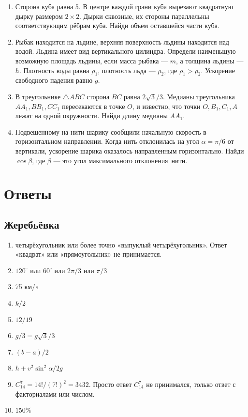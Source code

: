 \documentclass[12pt]{article} %
\begin{document}
\begin{enumerate}
\item Сторона куба равна 5. В центре каждой грани куба вырезают квадратную дырку размером $2 \times 2$. 
Дырки сквозные, их стороны параллельны соответствующим рёбрам куба. Найди объем оставшейся части куба.

\item Рыбак находится на льдине, верхняя поверхность льдины находится над водой. 
Льдина имеет вид вертикального цилиндра. Определи наименьшую возможную площадь льдины, если масса рыбака — $m$, 
а толщина льдины — $h$. Плотность воды равна $\rho_1$, плотность льда — $\rho_2$, где $\rho_1 > \rho_2$. 
Ускорение свободного падения равно $g$.

\item В треугольнике $\bigtriangleup ABC$ сторона $BC$ равна $2 \sqrt{3} / 3$. 
Медианы треугольника $A A_1$,\,$B B_1$,\,$C C_1$ пересекаются в точке $O$, и известно, 
что точки $O$,\,$B_1$,\,$C_1$,\,$A$ лежат на одной окружности. Найди длину медианы $A A_1$.

\item Подвешенному на нити шарику сообщили начальную скорость в горизонтальном направлении. 
Когда нить отклонилась на угол $\alpha = \pi/6$ от вертикали, ускорение шарика оказалось направленным горизонтально. 
Найди $\cos\beta$, где $\beta$ — это угол максимального отклонения~нити.

\end{enumerate}
    

\section*{Ответы}

\subsection*{Жеребьёвка}

\begin{enumerate}
\item четырёхугольник или более точно «выпуклый четырёхугольник». Ответ «квадрат» или «прямоугольник» не принимается.
\item $120^{\circ}$ или $60^{\circ}$ или $2\pi/3$ или $\pi/3$
\item 75 км/ч
\item $k/2$
\item $12/19$
\item $g/ 3 = g \sqrt{3}/3$
\item $(b − a)/2$
\item $h + v^2 \sin^2 \alpha/2g$
\item $C_{14}^7 = 14!/(7!)^2=3432$. Просто ответ $C_{14}^7$ не принимался, только ответ с факториалами или числом. 
\item $150\%$
\end{enumerate}
\end{document}
